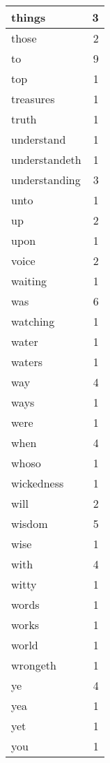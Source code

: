 \begin{center}
\begin{longtable}{l|r}
things & 3\\ \hline 
those & 2\\ \hline 
to & 9\\ \hline 
top & 1\\ \hline 
treasures & 1\\ \hline 
truth & 1\\ \hline 
understand & 1\\ \hline 
understandeth & 1\\ \hline 
understanding & 3\\ \hline 
unto & 1\\ \hline 
up & 2\\ \hline 
upon & 1\\ \hline 
voice & 2\\ \hline 
waiting & 1\\ \hline 
was & 6\\ \hline 
watching & 1\\ \hline 
water & 1\\ \hline 
waters & 1\\ \hline 
way & 4\\ \hline 
ways & 1\\ \hline 
were & 1\\ \hline 
when & 4\\ \hline 
whoso & 1\\ \hline 
wickedness & 1\\ \hline 
will & 2\\ \hline 
wisdom & 5\\ \hline 
wise & 1\\ \hline 
with & 4\\ \hline 
witty & 1\\ \hline 
words & 1\\ \hline 
works & 1\\ \hline 
world & 1\\ \hline 
wrongeth & 1\\ \hline 
ye & 4\\ \hline 
yea & 1\\ \hline 
yet & 1\\ \hline 
you & 1\\ \hline 
\end{longtable}  
\end{center}  


  
\normalsize  

  
  
